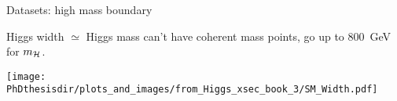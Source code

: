 \begin{frame}{Datasets: high mass boundary}

\begin{minipage}[c]{.45\textwidth}
\manip Higgs width $\simeq$ Higgs mass 
\submanip can't have coherent mass points,
\submanip go up to \SI{800}{\GeV} for $m_{\mathcal{H}}$.
\end{minipage}
\hfill
\begin{minipage}[c]{.45\textwidth}
\vspace{-\baselineskip}
\begin{center}
\texttt{[image: \\PhDthesisdir/plots\_and\_images/from\_Higgs\_xsec\_book\_3/SM\_Width.pdf]}
\end{center}
\end{minipage}

\end{frame}

